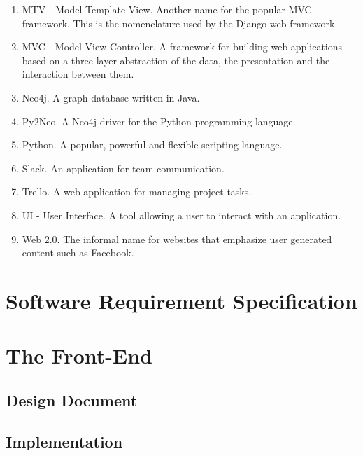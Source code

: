 \documentclass[12pt,onecolumn]{article}
\begin{document}
\begin{enumerate}
		\item MTV - Model Template View. Another name for the popular MVC framework. This is the nomenclature used by the Django web framework.

		\item MVC - Model View Controller. A framework for building web applications based on a three layer abstraction of the data, the presentation and the interaction between them. 

		\item Neo4j. A graph database written in Java.

		\item Py2Neo. A Neo4j driver for the Python programming language.

		\item Python. A popular, powerful and flexible scripting language.

		\item Slack. An application for team communication.

		\item Trello. A web application for managing project tasks.

		\item UI - User Interface. A tool allowing a user to interact with an application.

		\item Web 2.0. The informal name for websites that emphasize user generated content such as Facebook.


	\end{enumerate}

\section{Software Requirement Specification} %

\section{The Front-End}

	

	\subsection{Design Document} %

	\subsection{Implementation} %
\end{document}
